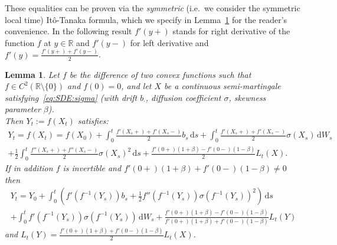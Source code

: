 \documentclass[12pt]{article}
\numberwithin{equation}{section}
\newtheorem{lemma}{Lemma}
\theoremstyle{definition}
\theoremstyle{remark}
\newcommand{\RR}{\mathbb{R}}
\newcommand{\vd}{\,\mathrm{d}}
\begin{document}
These equalities can be proven via the {\it symmetric} (i.e.~we consider the symmetric local time) It\^o-Tanaka formula, which we specify in Lemma~\ref{lem:Ito-Tanaka} for the reader's convenience. 
%
In the following result $f'(y+)$ stands for right derivative of the function $f$ at $y\in \RR$ and $f'(y-)$ for left derivative and $f'(y)=\frac{f'(y+)+ f'(y-)}{2}$.
%
\begin{lemma} \label{lem:Ito-Tanaka}
Let $f$ be the difference of two convex functions such that $f\in C^{2}(\mathbb{R}\setminus\{0\})$ %
and $f(0)=0$,
and let $X$ be a continuous semi-martingale satisfying~\eqref{eq:SDE:sigma} (with drift $b_\cdot$, diffusion coefficient $\sigma$, skewness parameter $\beta$).
\\
Then $Y_t:=f(X_t)$ satisfies: %
\begin{multline}
	Y_t=f(X_t) = f(X_0) + \int_0^t \frac{f'( X_s+) + f'(  X_s -)}{2} b_s \vd s +  \int_0^t \frac{f'( X_s+) + f'(  X_s -)}{2} \sigma(X_s) \vd W_s
	\\+ \frac12 \int_0^t \frac{f''(X_s+) + f''(X_s-)}{2} \sigma(X_s)^2 \vd s 
	+ \frac{f'(0+) (1+\beta)  - f'(0-) (1-\beta)}{ 2 } L_t(X).
\end{multline}
If in addition $f$ is invertible %
and $f'(0+) (1+\beta) + f'(0-) (1-\beta) \neq 0$ then
\begin{multline}
	Y_t = Y_0 + \int_0^t \left( f'( f^{-1}(Y_s) ) b_s + \frac12 f''(f^{-1}(Y_s)) \sigma(f^{-1}(Y_s))^2 \right) \vd s 
	\\
	+ \int_0^t  f'(f^{-1}(Y_s)) \sigma(f^{-1}(Y_s))  \vd W_s 
	+ \frac{f'(0+) (1+\beta) - f'(0-) (1-\beta) }{ f'(0+) (1+\beta) + f'(0-) (1-\beta)} L_t(Y) 
\end{multline}
and $L_t(Y) = \frac{f'(0+) (1+\beta) + f'(0-) (1-\beta)}{2} L_t(X)$.
\end{lemma}
%
\end{document}
